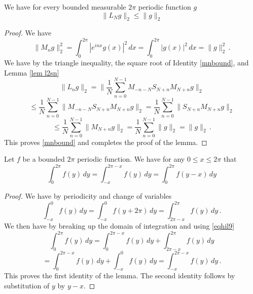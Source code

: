 {\begin{lemma}
We have for every bounded measurable $2\pi$ periodic function $g$
\begin{equation}\label{lnbound}
    \|L_Ng\|_2\le \|g\|_2
\end{equation}
\end{lemma}
\begin{proof}
    We have
    \begin{equation}\label{mnbound}
        \|M_ng\|_2^2=\int _0^{2\pi} |e^{inx}g(x)|^2\, dx
        =\int _0^{2\pi} |g(x)|^2\, dx=\|g\|_2^2\, .
    \end{equation}
     We have by the triangle inequality, the square root of Identity \eqref{mnbound}, and Lemma \ref{lem l2sn}
    \begin{equation*}
        \|L_ng\|_2=\|\frac 1N\sum_{n=0}^{N-1}
       M_{-n-N} S_{N+n}M_{N+n}g\|_2
    \end{equation*}
    \begin{equation*}
        \le \frac 1N\sum_{n=0}^{N-1} \|
       M_{-n-N} S_{N+n}M_{N+n}g\|_2
         = \frac 1N\sum_{n=0}^{N-1} \|
    S_{N+n}M_{N+n}g\|_2
    \end{equation*}
       \begin{equation}
     \le \frac 1N\sum_{n=0}^{N-1} \|
 M_{N+n}g\|_2  = \frac 1N\sum_{n=0}^{N-1} \|
g\|_2 =\|g\|_2\, .
    \end{equation}
This proves \eqref{mnbound} and completes the proof of the lemma.
\end{proof}

\begin{lemma}\label{lem shift}
Let $f$ be a bounded $2\pi$ periodic function. We have for any
$0 \le x\le 2\pi$ that
\begin{equation}
 \int_0^{2\pi} f(y)\, dy= \int_{-x}^{2\pi -x}   f(y)\, dy
 =\int_{0}^{2\pi}   f(y-x)\, dy
\end{equation}
\end{lemma}
\begin{proof}
    We have  by periodicity and change of variables
    \begin{equation}\label{eqhil9}
 \int_{-x}^{0} f(y)\, dy=\int_{-x}^{0} f(y+2\pi)\, dy= \int_{2\pi -x}^{2\pi}   f(y)\, dy\, .
\end{equation}
We then have by breaking up the domain of integration
and using \eqref{eqhil9}
\begin{equation*}
 \int_0^{2\pi} f(y)\, dy= \int_0^{2\pi -x}   f(y)\, dy+
 \int_{2\pi -x}^{2\pi}   f(y)\, dy
 \end{equation*}
\begin{equation}
= \int_0^{2\pi -x}   f(y)\, dy+
 \int_{ -x}^{0}   f(y)\, dy
 = \int_{-x}^{2\pi-x} f(y)\, dy\, .
 \end{equation}
This proves the first identity of the lemma. The second identity follows by substitution of $y$ by $y-x$.
\end{proof}



}
